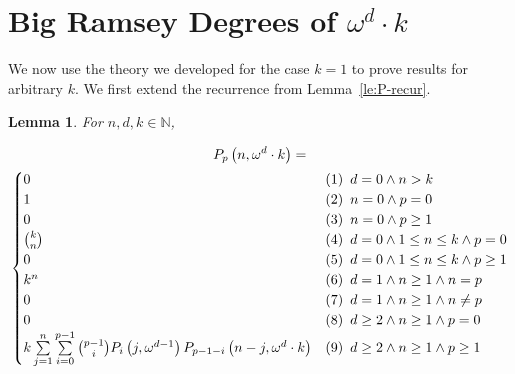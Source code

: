 \documentclass[11pt]{article}
\newcommand{\om}{\omega}
\newcommand{\N}{\mathbb{N}}
\newcommand{\numpoints}{n}
\theoremstyle{plain}
\newtheorem{lemma}[theorem]{Lemma}
\theoremstyle{definition}
\begin{document}
\section{Big Ramsey Degrees of \texorpdfstring{$\om^d \cdot k$}{omega d * k}}\label{se:ord2} 

We now use the theory we developed for the case $k=1$ to prove results for arbitrary $k$. We first extend the recurrence from Lemma~\ref{le:P-recur}.

\begin{lemma}
\label{le:P-recur-k}
For $\numpoints,d,k \in \N$,

\begin{multline*}
    P_p\left( \numpoints,\om^d \cdot k\right) = \\
    \begin{cases}
    0 & \textnormal{(1)\phantom{0} } d = 0 \land \numpoints > k\\
    1 & \textnormal{(2)\phantom{0} } \numpoints = 0 \land p = 0\\
    0 & \textnormal{(3)\phantom{0} } \numpoints = 0 \land p \geq 1\\
    \binom{k}{\numpoints} & \textnormal{(4)\phantom{0} } d = 0 \land 1 \leq \numpoints \leq k \land p = 0\\
    0 & \textnormal{(5)\phantom{0} } d = 0 \land 1 \leq \numpoints \leq k \land p \geq 1\\
    k^\numpoints & \textnormal{(6)\phantom{0} } d = 1 \land \numpoints \geq 1 \land \numpoints = p\\
    0 & \textnormal{(7)\phantom{0} } d = 1 \land \numpoints \geq 1 \land \numpoints \neq p\\
    0 & \textnormal{(8)\phantom{0} } d \geq 2 \land \numpoints \geq 1 \land p = 0\\
    k \sum\limits_{j=1}^\numpoints
    \sum\limits_{i=0}^{p-1} \binom{p-1}{i} P_i \left( j,\om^{d-1} \right) P_{p-1-i} \left( \numpoints-j,\om^d \cdot k\right)
    & \textnormal{(9)\phantom{0} } d \geq 2 \land \numpoints \geq 1 \land p \geq 1
    \end{cases}
\end{multline*}


\end{lemma}
\end{document}
